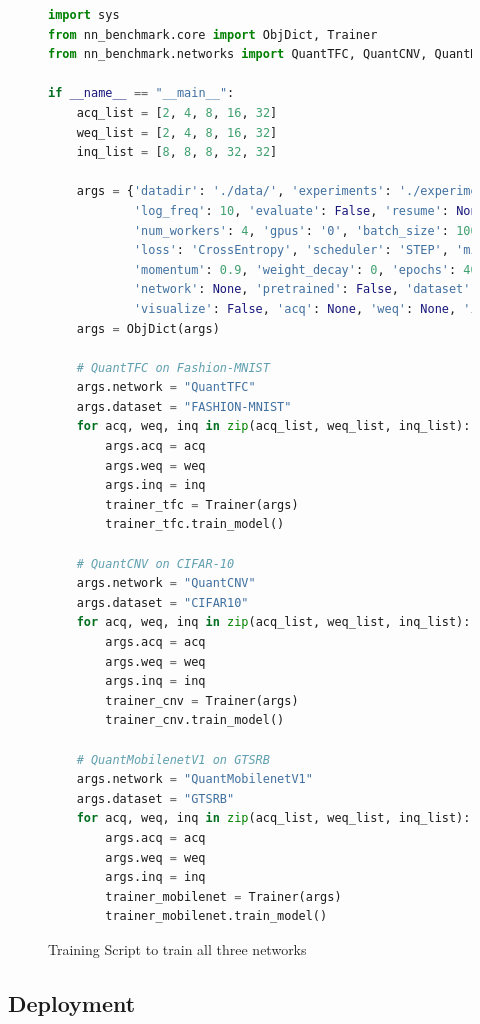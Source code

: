 \begin{figure}[htbp]
\centering
\begin{lstlisting}[language=Python]
import sys
from nn_benchmark.core import ObjDict, Trainer
from nn_benchmark.networks import QuantTFC, QuantCNV, QuantMobilenetV1

if __name__ == "__main__":
    acq_list = [2, 4, 8, 16, 32]
    weq_list = [2, 4, 8, 16, 32]
    inq_list = [8, 8, 8, 32, 32]

    args = {'datadir': './data/', 'experiments': './experiments', 'dry_run': False,
            'log_freq': 10, 'evaluate': False, 'resume': None, 'detect_nan': False,
            'num_workers': 4, 'gpus': '0', 'batch_size': 100, 'lr': 0.01, 'optim': 'ADAM',
            'loss': 'CrossEntropy', 'scheduler': 'STEP', 'milestones': '34,37',
            'momentum': 0.9, 'weight_decay': 0, 'epochs': 40, 'random_seed': 1,
            'network': None, 'pretrained': False, 'dataset': None,
            'visualize': False, 'acq': None, 'weq': None, 'inq': None, 'onnx': False}
    args = ObjDict(args)

    # QuantTFC on Fashion-MNIST
    args.network = "QuantTFC"
    args.dataset = "FASHION-MNIST"
    for acq, weq, inq in zip(acq_list, weq_list, inq_list):
        args.acq = acq
        args.weq = weq
        args.inq = inq
        trainer_tfc = Trainer(args)
        trainer_tfc.train_model()

    # QuantCNV on CIFAR-10
    args.network = "QuantCNV"
    args.dataset = "CIFAR10"
    for acq, weq, inq in zip(acq_list, weq_list, inq_list):
        args.acq = acq
        args.weq = weq
        args.inq = inq
        trainer_cnv = Trainer(args)
        trainer_cnv.train_model()

    # QuantMobilenetV1 on GTSRB
    args.network = "QuantMobilenetV1"
    args.dataset = "GTSRB"
    for acq, weq, inq in zip(acq_list, weq_list, inq_list):
        args.acq = acq
        args.weq = weq
        args.inq = inq
        trainer_mobilenet = Trainer(args)
        trainer_mobilenet.train_model()
\end{lstlisting}
\caption[Training Script]{Training Script to train all three networks}
	\label{fig:TrainingScript}
\end{figure}


\subsection{Deployment}

